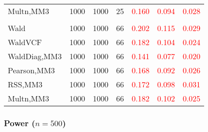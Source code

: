 \documentclass[
]{article}
\begin{document}
\begin{table}[H]
{\begin{tabular}[t]{lrrrrrr}
\hspace{1em}Multn,MM3 & 1000 & 1000 & 25 & \textcolor{red}{0.160} & \textcolor{red}{0.094} & \textcolor{red}{0.028}\\
\addlinespace[0.3em]
\multicolumn{7}{l}{\textbf{3F 15V}}\\
\hspace{1em}Wald & 1000 & 1000 & 66 & \textcolor{red}{0.202} & \textcolor{red}{0.115} & \textcolor{red}{0.029}\\
\hspace{1em}WaldVCF & 1000 & 1000 & 66 & \textcolor{red}{0.182} & \textcolor{red}{0.104} & \textcolor{red}{0.024}\\
\hspace{1em}WaldDiag,MM3 & 1000 & 1000 & 66 & \textcolor{red}{0.141} & \textcolor{red}{0.077} & \textcolor{red}{0.020}\\
\hspace{1em}Pearson,MM3 & 1000 & 1000 & 66 & \textcolor{red}{0.168} & \textcolor{red}{0.092} & \textcolor{red}{0.026}\\
\hspace{1em}RSS,MM3 & 1000 & 1000 & 66 & \textcolor{red}{0.172} & \textcolor{red}{0.098} & \textcolor{red}{0.031}\\
\hspace{1em}Multn,MM3 & 1000 & 1000 & 66 & \textcolor{red}{0.182} & \textcolor{red}{0.102} & \textcolor{red}{0.025}\\
\bottomrule
\end{tabular}}
\endgroup{}
\end{table}

\hypertarget{power-n500-3}{%
\subsubsection{\texorpdfstring{Power
(\(n=500\))}{Power (n=500)}}\label{power-n500-3}}
\end{document}
